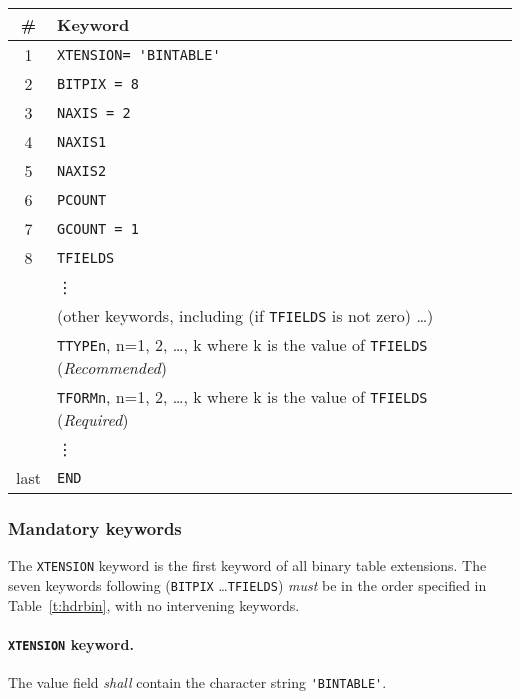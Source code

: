 \documentclass[onecolumn]{aa}
\begin{document}
\begin{table*}
\centering
\caption{Mandatory keywords in binary table extensions.}
\label{t:hdrbin}
\begin{tabular}{cl} 
\hline \hline
\# & Keyword   \\
\hline
       1 & {\verb*+XTENSION= 'BINTABLE'+} \\
       2 & {\tt BITPIX = 8} \\
       3 & {\tt NAXIS = 2} \\
       4 & {\tt NAXIS1} \\
       5 & {\tt NAXIS2} \\
       6 & {\tt PCOUNT} \\
       7 & {\tt GCOUNT = 1} \\
       8 & {\tt TFIELDS} \\
         & \vdots \\
         & (other keywords, including (if {\tt TFIELDS} is not zero) \ldots ) \\
         & {\tt TTYPEn}, n=1, 2, \ldots, k where k is 
           the value of {\tt TFIELDS} ({\em Recommended})\\
         & {\tt TFORMn}, n=1, 2, \ldots, k where k is 
           the value of {\tt TFIELDS} ({\em Required})\\
         & \vdots \\
    last  & {\tt END} \\
\hline
\end{tabular}
\end{table*}
   
   \subsubsection{Mandatory keywords}
       \label{s:btmk}

   The {\tt XTENSION} keyword is the first keyword of all binary
   table extensions.  The seven keywords
   following ({\tt BITPIX} \ldots {\tt TFIELDS})
   {\em must} be in the order specified in Table~\ref{t:hdrbin}, with no
   intervening keywords.    



   \paragraph{{\tt XTENSION} keyword.}
 The value field {\em shall} contain the 
 character string \verb*+'BINTABLE'+.
  
\end{document}
